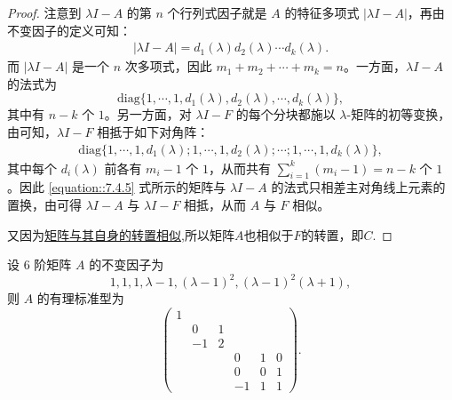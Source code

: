 \documentclass[../../main.tex]{subfiles}%
\begin{document}
\begin{proof}

注意到 $\lambda I - A$ 的第 $n$ 个行列式因子就是 $A$ 的特征多项式 $|\lambda I - A|$，再由不变因子的定义可知：
\begin{align*}
|\lambda I - A| = d_1(\lambda)d_2(\lambda)\cdots d_k(\lambda).
\end{align*}
而 $|\lambda I - A|$ 是一个 $n$ 次多项式，因此 $m_1 + m_2 + \cdots + m_k = n$。一方面，$\lambda I - A$ 的法式为
\[
\mathrm{diag}\{1,\cdots,1,d_1(\lambda),d_2(\lambda),\cdots,d_k(\lambda)\},
\]
其中有 $n - k$ 个 $1$。另一方面，对 $\lambda I - F$ 的每个分块都施以 $\lambda$-矩阵的初等变换，由可知，$\lambda I - F$ 相抵于如下对角阵：
\begin{align}
\mathrm{diag}\{1,\cdots,1,d_1(\lambda);1,\cdots,1,d_2(\lambda);\cdots;1,\cdots,1,d_k(\lambda)\},
\label{equation::7.4.5}
\end{align}
其中每个 $d_i(\lambda)$ 前各有 $m_i - 1$ 个 $1$，从而共有 $\sum_{i = 1}^{k}(m_i - 1)=n - k$ 个 $1$。因此 \eqref{equation::7.4.5} 式所示的矩阵与 $\lambda I - A$ 的法式只相差主对角线上元素的置换，由可得 $\lambda I - A$ 与 $\lambda I - F$ 相抵，从而 $A$ 与 $F$ 相似。

又因为\hyperref[proposition:lambda-矩阵一定与其转置相似]{矩阵与其自身的转置相似},所以矩阵$A$也相似于$F$的转置，即$C$.

\end{proof}

\begin{example}
设 6 阶矩阵 $A$ 的不变因子为
\[
1,1,1,\lambda - 1,(\lambda - 1)^2,(\lambda - 1)^2(\lambda + 1),
\]
则 $A$ 的有理标准型为
\[
\begin{pmatrix}
1 & & & & & \\
& 0 & 1 & & & \\
& -1 & 2 & & & \\
& & & 0 & 1 & 0 \\
& & & 0 & 0 & 1 \\
& & & -1 & 1 & 1
\end{pmatrix}.
\] 
\end{example}
\end{document}
